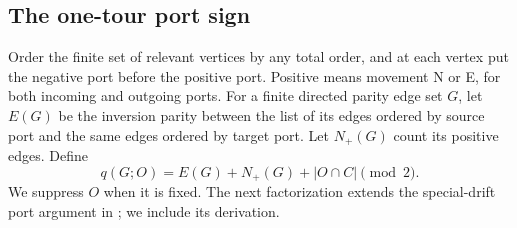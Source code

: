 \subsection{The one-tour port sign}\label{axis:sec:sign}
Order the finite set of relevant vertices by any total order, and at each
vertex put the negative port before the positive port. Positive means movement
N or E, for both incoming and outgoing ports. For a finite directed parity
edge set $G$, let $E(G)$ be the inversion parity between the list of its edges
ordered by source port and the same edges ordered by target port. Let
$N_+(G)$ count its positive edges. Define
\begin{equation}\label{axis:eq:q}
 q(G;O)=E(G)+N_+(G)+|O\cap C|\pmod2.
\end{equation}
We suppress $O$ when it is fixed. The next factorization extends the
special-drift port argument in \cite{Jillhewar2026}; we include its derivation.

